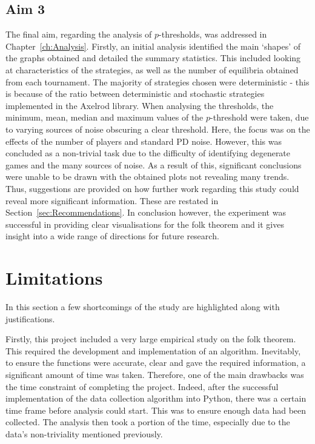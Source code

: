 \subsection{Aim 3}\label{subsec:Aim_3_concl}
The final aim, regarding the analysis of \(p\)-thresholds, was addressed in
Chapter~\ref{ch:Analysis}. Firstly, an initial analysis identified the main `shapes' of the graphs obtained and detailed the summary
statistics. This included looking at characteristics of the strategies, as well
as the number of equilibria obtained from each tournament. The majority of
strategies chosen were deterministic - this is because of the ratio between
deterministic and stochastic strategies implemented in the Axelrod library. When
analysing the thresholds, the minimum, mean, median and maximum
values of the \(p\)-threshold were taken, due to varying sources of noise
obscuring a clear threshold. Here, the focus was on the effects of the number
of players and standard PD noise. However, this was
concluded as a non-trivial task due to the difficulty of identifying degenerate
games and the many sources of noise. As a
result of this, significant conclusions were unable to be drawn with the
obtained plots not revealing many trends. Thus, suggestions are
provided on how further work regarding this study could reveal more significant
information. These are restated in Section~\ref{sec:Recommendations}. In
conclusion however, the experiment was successful in providing clear
visualisations for the folk theorem and it gives insight into a wide range of
directions for future research.

\section{Limitations}\label{sec:Limitations}
In this section a few shortcomings of the study are highlighted along
with justifications.

Firstly, this project included a very large empirical study on the folk theorem.
This required the development and implementation of an algorithm.
Inevitably, to ensure the functions were
accurate, clear and gave the required information, a significant amount of time
was taken. Therefore, one of the main
drawbacks was the time constraint of completing the project. Indeed, after the
successful implementation of the data collection algorithm into Python, there
was a certain time frame before analysis could start. This was to ensure enough data had
been collected. The analysis then took a portion of the time,
especially due to the data's non-triviality mentioned previously.

